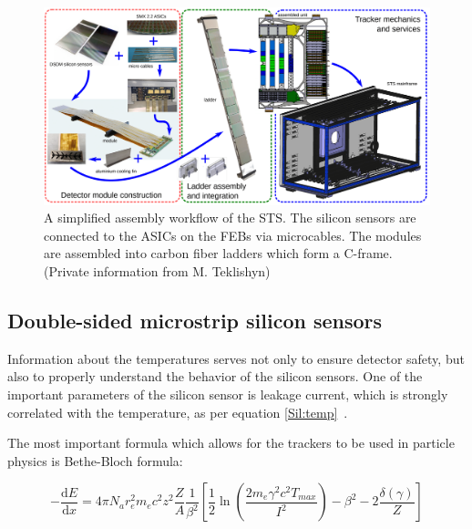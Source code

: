 \newpage
\begin{figure}[!h]
\centering
\includegraphics[width=1\columnwidth]{Chapter2/images/assembly_sequence.png}
\caption{A simplified assembly workflow of the \gls{STS}. The silicon sensors are connected to the ASICs on the \glspl{FEB} via microcables. The modules are assembled into carbon fiber ladders which form a C-frame. (Private information from M. Teklishyn)}
\label{fig_assembly}
\end{figure}






\subsection{Double-sided microstrip silicon sensors}
\label{sensors}

Information about the temperatures serves not only to ensure detector safety, but also to properly understand the behavior of the silicon sensors. One of the important parameters of the silicon sensor is leakage current, which is strongly correlated with the temperature, as per equation \ref{Sil:temp}~\cite{Hartmann:2017gzy}.

The most important formula which allows for the trackers to be used in particle physics is Bethe-Bloch formula:

\begin{equation}
-\dfrac{\mathrm dE}{\mathrm dx} = 4 \pi N_{a} r_{e}^{2} m_{e} c^{2} z^{2}  \dfrac{Z}{A} \frac{1}{\beta^{2}} \left[ \frac{1}{2}\ln(\frac{2m_{e}\gamma^{2}c^{2} T_{max}}{I^{2}}) - \beta^{2} -  2\frac{\delta(\gamma)}{Z}\right]
\end{equation}


